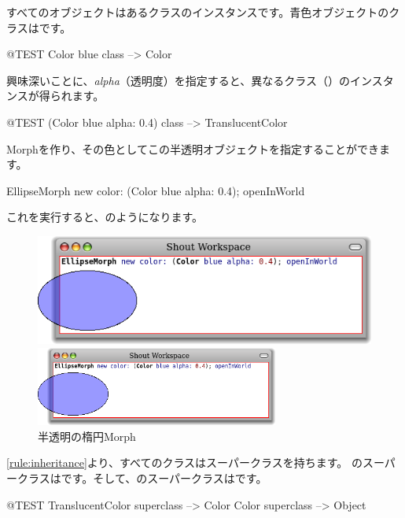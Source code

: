 \documentclass[a4paper,10pt,twoside]{book}
\begin{document}
\noindent
すべてのオブジェクトはあるクラスのインスタンスです。青色オブジェクトのクラスはです。
\begin{code}{@TEST}
Color blue class --> Color
\end{code}

\noindent
興味深いことに、\emph{alpha}（透明度）を指定すると、異なるクラス（）のインスタンスが得られます。
\begin{code}{@TEST}
(Color blue alpha: 0.4) class --> TranslucentColor
\end{code}

\noindent
Morphを作り、その色としてこの半透明オブジェクトを指定することができます。
\begin{code}{}
EllipseMorph new color: (Color blue alpha: 0.4); openInWorld
\end{code}
\noindent
これを実行すると、のようになります。

\begin{center}
\begin{figure}[!ht]
\ifluluelse
	{\centerline {\includegraphics[scale=0.7]{TranslucentEllipse}}}
	{\centerline {\includegraphics[width=8cm]{TranslucentEllipse}}}
\caption{半透明の楕円Morph}
\end{figure}
\end{center}

\ref{rule:inheritance}より、すべてのクラスはスーパークラスを持ちます。
のスーパークラスはです。そして、のスーパークラスはです。
\begin{code}{@TEST}
TranslucentColor superclass --> Color
Color superclass                   --> Object
\end{code}
\end{document}
